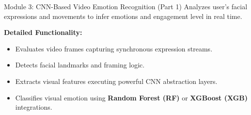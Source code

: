 \documentclass{beamer}
\begin{document}
\begin{frame}{Module 3: CNN-Based Video Emotion Recognition (Part 1)}
Analyzes user’s facial expressions and movements to infer emotions and engagement level in real time.

\vspace{0.3cm}
\textbf{Detailed Functionality:}
\begin{itemize}
    \item Evaluates video frames capturing synchronous expression streams.
    \item Detects facial landmarks and framing logic.
    \item Extracts visual features executing powerful CNN abstraction layers.
    \item Classifies visual emotion using \textbf{Random Forest (RF)} or \textbf{XGBoost (XGB)} integrations.
\end{itemize}
\end{frame}
\end{document}
